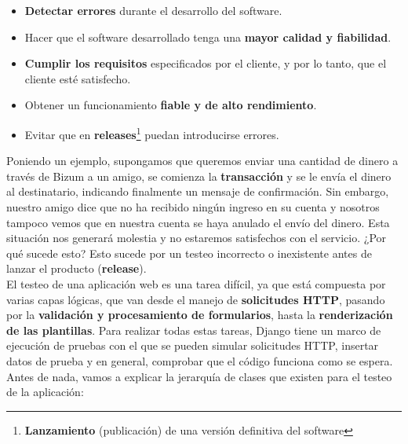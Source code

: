     \begin{itemize}
        \item \textbf{Detectar errores} durante el desarrollo del software.
        \item Hacer que el software desarrollado tenga una \textbf{mayor calidad y
        fiabilidad}.
        \item \textbf{Cumplir los requisitos} especificados por el cliente, y por lo tanto,
        que el cliente esté satisfecho.
        \item Obtener un funcionamiento \textbf{fiable y de alto rendimiento}.
        \item Evitar que en \textbf{releases}\footnote{\textbf{Lanzamiento} (publicación)
        de una versión definitiva del software} puedan introducirse errores.
    \end{itemize}

Poniendo un ejemplo, supongamos que queremos enviar una cantidad de dinero a través de
Bizum a un amigo, se comienza la \textbf{transacción} y se le envía el dinero al
destinatario, indicando finalmente un mensaje de confirmación. Sin embargo, nuestro amigo
dice que no ha recibido ningún ingreso en su cuenta y nosotros tampoco vemos que en nuestra
cuenta se haya anulado el envío del dinero. Esta situación nos generará molestia y no
estaremos satisfechos con el servicio. ¿Por qué sucede esto? Esto sucede por un testeo
incorrecto o inexistente antes de lanzar el producto (\textbf{release}).\\

El testeo de una aplicación web es una tarea difícil, ya que está compuesta por varias
capas lógicas, que van desde el manejo de \textbf{solicitudes HTTP}, pasando por la
\textbf{validación y procesamiento de formularios}, hasta la \textbf{renderización de las
plantillas}. Para realizar todas estas tareas, Django tiene un marco de ejecución de
pruebas con el que se pueden simular solicitudes HTTP, insertar datos de prueba y en
general, comprobar que el código funciona como se espera.\\

Antes de nada, vamos a explicar la jerarquía de clases que existen para el testeo de la
aplicación:

